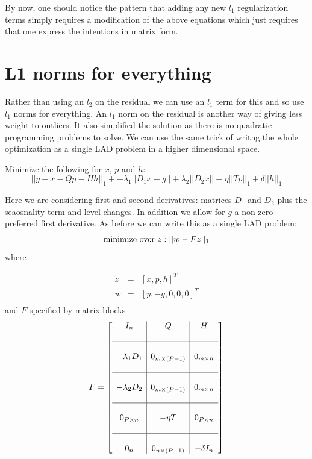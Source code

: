\documentclass{article}
\begin{document}
By now, one should notice the pattern that adding any new $l_1$ regularization
terms simply requires a modification of the above equations which just requires
that one express the intentions in matrix form.

\section{L1 norms for everything}

Rather than using an $l_2$ on the residual we can use an $l_1$ term for this and so use
$l_1$ norms for everything. An $l_1$ norm on the residual is another way of giving less
weight to outliers. It also simplified the solution as there is no quadratic programming
problems to solve. We can use the same trick of writng the whole optimization as a single
LAD problem in a higher dimensional space.

Minimize the following for $x$, $p$ and $h$:
\begin{equation}
||y - x - Q p -H h||_1 + + \lambda_1 ||D_1 x - g|| + \lambda_2 ||D_2 x||
+ \eta ||T p||_1 + \delta ||h||_1
\end{equation}

Here we are considering first and second derivatives: matrices $D_1$ and $D_2$ plus the seaosnality
term and level changes. In addition we allow for $g$ a non-zero preferred first derivative. As before
we can write this as a single LAD problem:
\[
\mbox{minimize over}~ z :  ||w-F z||_1 \\
\]
where

\begin{eqnarray}
z & = & [x, p , h]^T\\
w & = & [y, -g, 0, 0, 0]^T \\
\end{eqnarray}
and $F$ specified by matrix blocks
\begin{equation}
F=\left[
\begin{array}{c|c|c}
I_n  & Q  & H \\
&\\
\hline
&\\
-\lambda_1 D_1 & 0_{m \times (P-1)} & 0_{m \times n}\\
&\\
\hline
&\\
-\lambda_2 D_2 & 0_{m \times (P-1)} & 0_{m \times n}\\
&\\
\hline
&\\
0_{P \times n} & -\eta T & 0_{P \times n} \\
&\\
\hline
&\\
0_{n} & 0_{n \times (P-1)} & -\delta I_n
\end{array}\right]
\end{equation}
\end{document}
